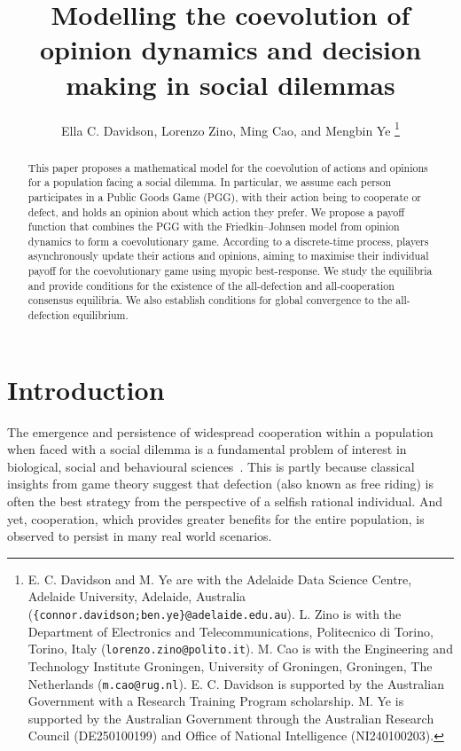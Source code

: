 \documentclass[letterpaper, 10 pt, conference]{ieeeconf}  %
\title{\LARGE \bf
Modelling the coevolution of opinion dynamics and decision making in social dilemmas}
\author{Ella C. Davidson, Lorenzo Zino, Ming Cao, and Mengbin Ye
\thanks{E. C. Davidson and M. Ye are with the Adelaide Data Science Centre, Adelaide University, Adelaide, Australia (\texttt{\{connor.davidson;ben.ye\}@adelaide.edu.au}). L. Zino is with the Department of Electronics and Telecommunications, Politecnico di Torino, Torino, Italy (\texttt{lorenzo.zino@polito.it}). M. Cao is with the Engineering and Technology Institute Groningen, University of Groningen, Groningen, The Netherlands (\texttt{m.cao@rug.nl}). E. C. Davidson is supported by the Australian Government with a Research Training Program scholarship. M. Ye is supported by the Australian Government through the Australian Research Council (DE250100199) and Office of National Intelligence (NI240100203).}
}
\begin{document}
\maketitle
\thispagestyle{empty}

\begin{abstract}
This paper proposes a mathematical model for the coevolution of actions and opinions for a population facing a social dilemma. In particular, we assume each person participates in a Public Goods Game (PGG), with their action being to cooperate or defect, and holds an opinion about which action they prefer. We propose a payoff function that combines the PGG with the Friedkin--Johnsen model from opinion dynamics to form a coevolutionary game. According to a discrete-time process, players asynchronously update their actions and opinions, aiming to maximise their individual payoff for the coevolutionary game using myopic best-response. We study the equilibria and provide conditions for the existence of the all-defection and all-cooperation consensus equilibria. We also establish conditions for global convergence to the all-defection equilibrium.
\end{abstract}

\section{Introduction}\label{sec:intro}
The emergence and persistence of widespread cooperation within a population when faced with a social dilemma is a fundamental problem of interest in biological, social and behavioural sciences~\cite{kollock_dilemmas_1998, dawes1980social}. This is partly because classical insights from game theory suggest that defection (also known as free riding) is often the best strategy from the perspective of a selfish rational individual. And yet, cooperation, which provides greater benefits for the entire population, is observed to persist in many real world scenarios. 
\end{document}
